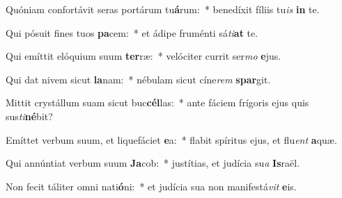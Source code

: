 \item Quóniam confortávit seras portárum tu\textbf{á}rum:~* benedíxit fíliis tu\textit{is} \textbf{in} te.
\item Qui pósuit fines tuos \textbf{pa}cem:~* et ádipe fruménti sá\textit{ti}\textbf{at} te.
\item Qui emíttit elóquium suum \textbf{ter}ræ:~* velóciter currit ser\textit{mo} \textbf{e}jus.
\item Qui dat nivem sicut \textbf{la}nam:~* nébulam sicut cíne\textit{rem} \textbf{spar}git.
\item Mittit crystállum suam sicut buc\textbf{cél}las:~* ante fáciem frígoris ejus quis sus\textit{ti}\textbf{né}bit?
\item Emíttet verbum suum, et liquefáciet \textbf{e}a:~* flabit spíritus ejus, et flu\textit{ent} \textbf{a}quæ.
\item Qui annúntiat verbum suum \textbf{Ja}cob:~* justítias, et judícia su\textit{a} \textbf{Is}raël.
\item Non fecit táliter omni nati\textbf{ó}ni:~* et judícia sua non manifestá\textit{vit} \textbf{e}is.

